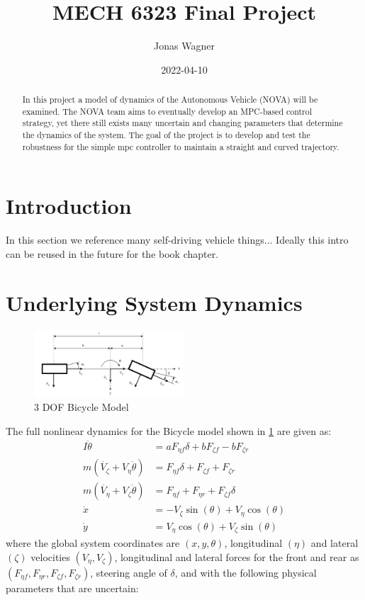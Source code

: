 \documentclass[conference, onecolumn]{IEEEtran}
\title{MECH 6323 Final Project\\ %
}
\author{Jonas Wagner}
\date{2022-04-10}
\begin{document}
\maketitle

\begin{abstract}
    In this project a model of dynamics of the Autonomous Vehicle (NOVA) will be examined. 
    The NOVA team aims to eventually develop an MPC-based control strategy, yet there still exists many uncertain and changing parameters that determine the dynamics of the system.
    The goal of the project is to develop and test the robustness for the simple mpc controller to maintain a straight and curved trajectory.
\end{abstract}

\section{Introduction}

In this section we reference many self-driving vehicle things... 
Ideally this intro can be reused in the future for the book chapter.


\section{Underlying System Dynamics}



\begin{figure}%
    \centering
    \includegraphics[width=0.5\textwidth]{figs/3dof_model_diag.png}
    \caption{3 DOF Bicycle Model}
    \label{fig:3dof_bike_model}
\end{figure}

The full nonlinear dynamics for the Bicycle model shown in \figurename{\ref{fig:3dof_bike_model}} are given as: \begin{align*}
    I \ddot{\theta}     &= a F_{\eta f} \delta + b F_{\zeta f} - b F_{\zeta r}\\
    m (\dot{V_{\zeta}} + V_\eta \dot{\theta}) &= F_{\eta f} \delta + F_{\zeta f} + F_{\zeta r}\\
    m(\dot{V_{\eta}} + V_\zeta \dot{\theta}) &= F_{\eta f} + F_{\eta r} + F_{\zeta f} \delta\\
    \dot{x} &= -V_{\zeta} \sin(\theta) + V_{\eta} \cos(\theta)\\
    \dot{y} &= V_{\eta} \cos(\theta) + V_{\zeta} \sin(\theta)
\end{align*}
where the global system coordinates are $(x, y, \theta)$, 
longitudinal $(\eta)$ and lateral $(\zeta)$ velocities $(V_\eta, V_\zeta)$,
longitudinal and lateral forces for the front and rear as $(F_{\eta f},F_{\eta r},F_{\zeta f},F_{\zeta r})$,
steering angle of $\delta$, 
and with the following physical parameters that are uncertain:
\end{document}
